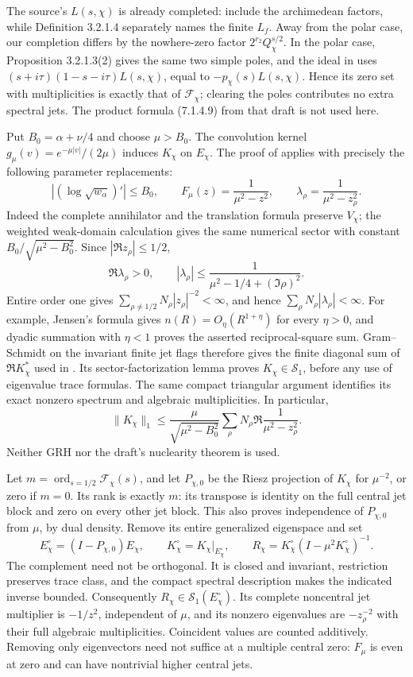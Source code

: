 The source's $L(s,\chi)$ is already completed: \cite[Definition 3.2.1.2 and (3.2.1.2)--(3.2.1.5), p.~123]{masullo} include the archimedean factors, while Definition 3.2.1.4 separately names the finite $L_f$. Away from the polar case, our completion differs by the nowhere-zero factor $2^{r_2}Q_\chi^{s/2}$. In the polar case, Proposition 3.2.1.3(2) gives the same two simple poles, and the ideal in \cite[Theorem 7.1.4.2(1), p.~326]{masullo} uses $(s+i\tau)(1-s-i\tau)L(s,\chi)$, equal to $-p_\chi(s)L(s,\chi)$. Hence its zero set with multiplicities is exactly that of $\mathcal F_\chi$; clearing the poles contributes no extra spectral jets. The product formula (7.1.4.9) from that draft is not used here.

Put $B_0=\alpha+\nu/4$ and choose $\mu>B_0$. The convolution kernel $g_\mu(v)=e^{-\mu|v|}/(2\mu)$ induces $K_\chi$ on $E_\chi$. The proof of  applies with precisely the following parameter replacements:
\[
 |(\log\sqrt{w_\alpha})'|\le B_0,\qquad
 F_\mu(z)=\frac1{\mu^2-z^2},\qquad
 \lambda_\rho=\frac1{\mu^2-z_\rho^2}.
\]
Indeed the complete annihilator and the translation formula preserve $V_\chi$; the weighted weak-domain calculation gives the same numerical sector with constant $B_0/\sqrt{\mu^2-B_0^2}$. Since $|\Re z_\rho|\le1/2$,
\[
 \Re\lambda_\rho>0,\qquad
 |\lambda_\rho|\le\frac1{\mu^2-1/4+(\Im\rho)^2}.
\]
Entire order one gives $\sum_{\rho\ne1/2}N_\rho|z_\rho|^{-2}<\infty$, and hence $\sum_\rho N_\rho|\lambda_\rho|<\infty$. For example, Jensen's formula gives $n(R)=O_\eta(R^{1+\eta})$ for every $\eta>0$, and dyadic summation with $\eta<1$ proves the asserted reciprocal-square sum. Gram--Schmidt on the invariant finite jet flags therefore gives the finite diagonal sum of $\Re K_\chi^*$ used in . Its sector-factorization lemma proves $K_\chi\in\mathcal S_1$, before any use of eigenvalue trace formulas. The same compact triangular argument identifies its exact nonzero spectrum and algebraic multiplicities. In particular,
\[
 \|K_\chi\|_1\le\frac{\mu}{\sqrt{\mu^2-B_0^2}}
 \sum_\rho N_\rho\Re\frac1{\mu^2-z_\rho^2}.
\]
Neither GRH nor the draft's nuclearity theorem is used.

Let $m=\operatorname{ord}_{s=1/2}\mathcal F_\chi(s)$, and let $P_{\chi,0}$ be the Riesz projection of $K_\chi$ for $\mu^{-2}$, or zero if $m=0$. Its rank is exactly $m$: its transpose is identity on the full central jet block and zero on every other jet block. This also proves independence of $P_{\chi,0}$ from $\mu$, by dual density. Remove its entire generalized eigenspace and set
\[
 E_\chi^\circ=(I-P_{\chi,0})E_\chi,\qquad
 K_\chi^\circ=K_\chi|_{E_\chi^\circ},\qquad
 R_\chi=K_\chi^\circ(I-\mu^2K_\chi^\circ)^{-1}.
\]
The complement need not be orthogonal. It is closed and invariant, restriction preserves trace class, and the compact spectral description makes the indicated inverse bounded. Consequently $R_\chi\in\mathcal S_1(E_\chi^\circ)$. Its complete noncentral jet multiplier is $-1/z^2$, independent of $\mu$, and its nonzero eigenvalues are $-z_\rho^{-2}$ with their full algebraic multiplicities. Coincident values are counted additively. Removing only eigenvectors need not suffice at a multiple central zero: $F_\mu$ is even at zero and can have nontrivial higher central jets.

